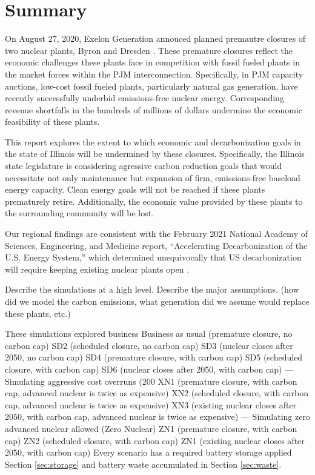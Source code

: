 \section{Summary}
On August 27, 2020, Exelon Generation annouced planned premautre closures of two nuclear plants, 
Byron and Dresden \cite{larson_exelon_2020}. These premature closures reflect 
the economic challenges these plants face in competition with fossil fueled 
plants in the market forces within the PJM interconnection. Specifically, in PJM capacity 
auctions,  low-cost fossil fueled plants, particularly natural gas generation, 
have recently successfully underbid emissions-free nuclear energy. 
Corresponding revenue shortfalls in the hundreds of millions of dollars
undermine the economic feasibility of these plants. 


This report explores the extent to which economic and decarbonization goals in
the state of Illinois will be undermined by these closures. Specifically, the
Illinois state legislature is considering agressive carbon reduction goals that
would necessitate not only maintenance but expansion of firm, emissions-free
baseload energy capacity.  Clean energy goals will not be reached if these
plants prematurely retire.  Additionally, the economic value provided by these
plants to the surrounding community will be lost. 

Our regional findings are consistent with the February 2021 National Academy of 
Sciences, Engineering, and Medicine report, ``Accelerating Decarbonization of 
the U.S. Energy System,'' which determined unequivocally that US decarbonization 
will require keeping existing nuclear plants open 
\cite{national_accelerating_2021}.


Describe the simulations at a high level.
Describe the major assumptions.
(how did we model the carbon emissions, what generation did we assume would 
replace these plants, etc.)

These simulations explored business 
Business as usual (premature closure, no carbon cap)
SD2 (scheduled closure, no carbon cap)
SD3 (nuclear closes after 2050, no carbon cap)
SD4 (premature closure, with carbon cap)
SD5 (scheduled closure, with carbon cap)
SD6 (nuclear closes after 2050, with carbon cap)
--- Simulating aggressive cost overruns (200%
XN1 (premature closure, with carbon cap, advanced nuclear is twice as expensive)
XN2 (scheduled closure, with carbon cap, advanced nuclear is twice as expensive)
XN3 (existing nuclear closes after 2050, with carbon cap, advanced nuclear is twice as expensive)
--- Simulating zero advanced nuclear allowed (Zero Nuclear)
ZN1 (premature closure, with carbon cap)
ZN2 (scheduled closure, with carbon cap)
ZN1 (existing nuclear closes after 2050, with carbon cap)
Every scenario has a required battery storage applied Section \ref{sec:storage} 
and battery waste accumulated in Section \ref{sec:waste}.

